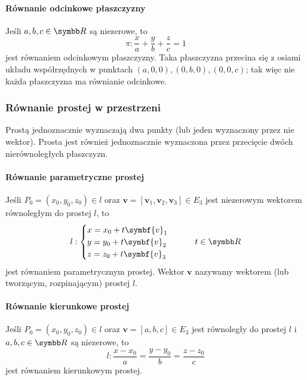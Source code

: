 \paragraph{Równanie odcinkowe płaszczyzny} Jeśli $a, b, c \in \RR$ są niezerowe, to
\begin{equation}
    \pi : \frac{x}{a} + \frac{y}{b} + \frac{z}{c} = 1
\end{equation}
jest równaniem odcinkowym płaszczyzny. Taka płaszczyzna przecina się z osiami układu współrzędnych w punktach $(a, 0, 0), (0, b, 0), (0, 0, c)$; tak więc nie każda płaszczyzna ma równianie odcinkowe.

\subsubsection{Równanie prostej w przestrzeni}
Prostą jednoznacznie wyznaczają dwa punkty (lub jeden wyznaczony przez nie wektor). Prosta jest również jednoznacznie wyznaczona przez przecięcie dwóch nierównoległych płaszczyzn.

\paragraph{Równanie parametryczne prostej} Jeśli $P_0 = (x_0, y_0, z_0) \in l$ oraz $\symbf{v} = [\symbf{v}_1, \symbf{v}_2, \symbf{v}_3] \in E_3$ jest niezerowym wektorem równoległym do prostej $l$, to
\begin{equation} l : \begin{cases}
    x = x_0 + t\symbf{v}_1 \\
    y = y_0 + t\symbf{v}_2 \\
    z = z_0 + t\symbf{v}_3
\end{cases} \qquad t \in \RR \end{equation}
jest równaniem parametrycznym prostej. Wektor $\symbf{v}$ nazywamy wektorem  (lub tworzącym, rozpinającym) prostej $l$.

\paragraph{Równanie kierunkowe prostej} Jeśli $P_0 = (x_0, y_0, z_0) \in l$ oraz $\symbf{v} = [a, b, c] \in E_3$ jest równoległy do prostej $l$ i $a, b, c \in \RR$ są niezerowe, to
\begin{equation}
    l : \frac{x - x_0}{a} = \frac{y - y_0}{b} = \frac{z - z_0}{c}
\end{equation}
jest równaniem kierunkowym prostej.

